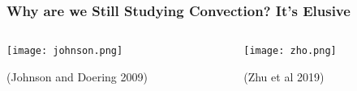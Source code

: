 \begin{frame}[fragile]
    \frametitle{Why are we Still Studying Convection? \textbf{It's Elusive}}
    \vfill
    \begin{columns}
        \begin{column}{.30\textwidth}
            \centering
            \texttt{[image: johnson.png]}

            {(Johnson and Doering 2009)}
        \end{column}

        \begin{column}{.60\textwidth}
            \centering
            \texttt{[image: zho.png]}

            {(Zhu et al 2019)}
        \end{column}
    \end{columns}
\end{frame}


